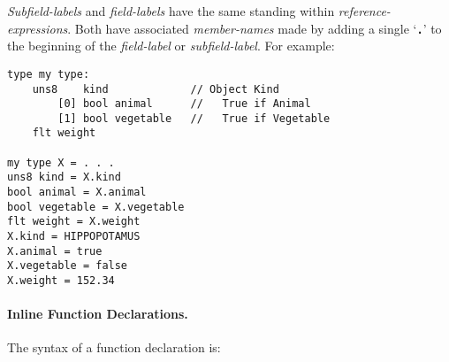 \documentclass[12pt]{article}
\newcommand{\subsubsubsection}[1]{\paragraph[#1]{#1.}}
\newcommand{\TT}[1]{{\tt \bfseries #1}}
\newenvironment{indpar}[1][0.3in]%
	{\begin{list}{}%
		     {\setlength{\itemsep}{0in}%
		      \setlength{\topsep}{0in}%
		      \setlength{\parsep}{1ex}%
		      \setlength{\labelwidth}{#1}%
		      \setlength{\leftmargin}{#1}%
		      \addtolength{\leftmargin}{\labelsep}}%
	 \item}%
	{\end{list}}
\begin{document}
{\em Subfield-labels} and {\em field-labels} have the same standing within
{\em reference-expressions}.
Both have associated {\em member-names} made by adding a single
`\TT{.}' to the beginning of the {\em field-label} or {\em subfield-label}.
For example:

\begin{indpar}\begin{verbatim}
type my type:
    uns8    kind             // Object Kind
        [0] bool animal      //   True if Animal
        [1] bool vegetable   //   True if Vegetable
    flt weight

my type X = . . .
uns8 kind = X.kind
bool animal = X.animal
bool vegetable = X.vegetable
flt weight = X.weight
X.kind = HIPPOPOTAMUS
X.animal = true 
X.vegetable = false
X.weight = 152.34
\end{verbatim}\end{indpar}



\subsubsubsection{Inline Function Declarations}
\label{INLINE-FUNCTION-DECLARATIONS}

The syntax of a function declaration is:
\end{document}
